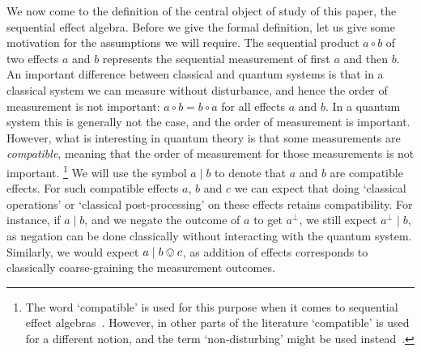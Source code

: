 \documentclass[a4paper, onecolumn, accepted=2020-12-22]{quantumarticle}
\newcommand{\mult}{\mathop{\circ}}
\newcommand{\commu}{\mathrel{\lvert}}
\theoremstyle{definition}
\begin{document}
We now come to the definition of the central object of study of this paper, 
the sequential effect algebra. Before we give the formal definition, let us give some motivation for the assumptions we will require.
The sequential product $a\mult b$ of two effects $a$ and $b$ represents the sequential measurement of first $a$ and then $b$.
An important difference between classical and quantum systems is that in a classical system we can measure without disturbance, and hence the order of measurement is not important: $a\mult b = b\mult a$ for all effects $a$ and $b$.
In a quantum system this is generally not the case, and the order of measurement is important.
However, what is interesting in quantum theory is that some measurements are \emph{compatible}, meaning that the order of measurement for those measurements is not important.%
\footnote{The word `compatible' is used for this purpose when it comes to sequential effect algebras~\cite{gudder2002sequential}. However, in other parts of the literature `compatible' is used for a different notion, and the term `non-disturbing' might be used instead~\cite{Heinosaari2019nofreeinformation}.} 
We will use the symbol $a\commu b$ to denote that $a$ and $b$ are compatible effects. 
For such compatible effects $a$, $b$ and $c$ we can expect that doing `classical operations' or `classical post-processing' on these effects retains compatibility. For instance, if $a\commu b$, and we negate the outcome of $a$ to get $a^\perp$, we still expect $a^\perp \commu b$, as negation can be done classically without interacting with the quantum system. Similarly, we would expect $a\commu b\ovee c$, as addition of effects corresponds to classically coarse-graining the measurement outcomes.
\end{document}
